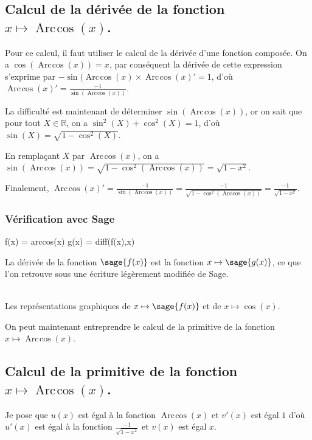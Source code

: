 \documentclass[a4paper,12pt]{report}
\def\eclaire{\mathbb}
\def\R{\ensuremath{\eclaire R}}
\renewcommand{\arccos}{\mathop{\mathrm{Arc\mspace{2mu}cos}}}
\begin{document}
\subsection{Calcul de la dérivée de la fonction $x \mapsto \arccos(x) $.}

Pour ce calcul, il faut utiliser le calcul de la dérivée d'une fonction composée. On a $\cos(\arccos(x))=x$, par conséquent la dérivée de cette expression s'exprime par $ -\sin(\arccos(x) \times \arccos(x)' = 1$, d'où $\arccos(x)' = \frac{-1}{\sin(\arccos(x))} $.

La difficulté est maintenant de déterminer $\sin(\arccos(x))$, or on sait que pour tout $X \in \R$, on a $\sin^2(X) + \cos^2(X) = 1$, d'où $\sin(X) = \sqrt{1-\cos^2(X)}$.

En remplaçant $X$ par $\arccos(x)$, 
on a $\sin(\arccos(x)) = \sqrt{1-\cos^2(\arccos(x))} = \sqrt{1- x^2}$.

Finalement, $\arccos(x)' = \frac{-1}{\sin(\arccos(x))} = \frac{-1}{\sqrt{1-\cos^2(\arccos(x))}} =  \frac{-1}{\sqrt{1- x^2}} $.

\subsubsection*{Vérification avec Sage}

\begin{sageblock}
    f(x) = arccos(x)
    g(x) = diff(f(x),x)
\end{sageblock}

La dérivée de la fonction $\sage{f(x)}$ est la fonction $x \mapsto \sage{g(x)} $, ce que l'on retrouve sous une écriture légèrement modifiée de Sage.


\begin{center}
\\
Les représentations graphiques de $x \mapsto \sage{f(x)} $ et de $x\mapsto \cos(x)$.
\end{center}

On peut maintenant entreprendre le calcul de la primitive de la  fonction  $x \mapsto \arccos(x) $.

\subsection{Calcul de la primitive de la fonction  $x \mapsto \arccos(x) $.}


Je pose que $u(x)$  est égal à la fonction $\arccos(x)$ et $v'(x)$ est égal $1$  d'où $u'(x)$  est égal à la fonction $ \frac{-1}{\sqrt{1- x^2}} $ et $v(x)$ est égal $x$.
\end{document}
